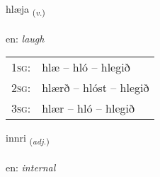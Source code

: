 \documentclass[frontgrid, backgrid]{flacards}\usepackage[]{graphicx}\usepackage[]{color}
\begin{document}
\renewcommand{\flhead}{\vskip5pt \fboxsep=0pt {\small\bfseries\footnotesize Sagnorð | Verb}}
\renewcommand{\fcfoot}{\vskip5pt \fboxsep=0pt \hspace{2pt}{\small\bfseries\footnotesize 2K}}

\renewcommand{\blhead}{\vskip5pt {\small\bfseries\footnotesize Sagnorð | Verb }}
\renewcommand{\bcfoot}{\vskip5pt \hspace{2pt}{\small\bfseries\footnotesize 2K}}


{hlæja \small{\textsubscript{(\textit{v.})}} \\[1ex] %
\textphonetic{[l̥aiːja]} \\
en: \emph{laugh} \\  [2ex]
\renewcommand*{\arraystretch}{0.8}
\begin{tabular}{p{1cm}l}
\textsc{1sg}: & hlæ -- hló -- hlegið \\ 
\textsc{2sg}: & hlærð -- hlóst -- hlegið \\ 
\textsc{3sg}: & hlær -- hló -- hlegið \\ 
\end{tabular}
}

\renewcommand{\flhead}{\vskip5pt \fboxsep=0pt {\small\bfseries\footnotesize Lýsingarorð | Adjective}}
\renewcommand{\fcfoot}{\vskip5pt \fboxsep=0pt \hspace{2pt}{\small\bfseries\footnotesize 2K}}

\renewcommand{\blhead}{\vskip5pt {\small\bfseries\footnotesize Lýsingarorð | Adjective }}
\renewcommand{\bcfoot}{\vskip5pt \hspace{2pt}{\small\bfseries\footnotesize 2K}}


{innri \small{\textsubscript{(\textit{adj.})}} \\[1ex] %
\textphonetic{[ɪnrɪ]} \\
en: \emph{internal} \\  [2ex]
\renewcommand*{\arraystretch}{0.8}
}
\end{document}
